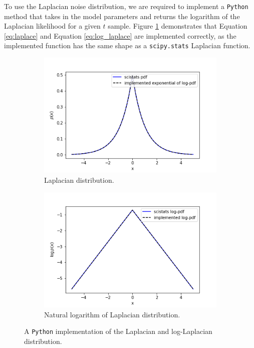 \documentclass{article}
\begin{document}
To use the Laplacian noise distribution, we are required to implement a \texttt{Python} method that takes in the model parameters and returns the logarithm of the Laplacian likelihood for a given $t$ sample. Figure \ref{fig:Q3b_laplace} demonstrates that Equation \eqref{eq:laplace} and Equation \eqref{eq:log_laplace} are implemented correctly, as the implemented function has the same shape as a \texttt{scipy.stats} Laplacian function.
\begin{figure}[!htb]
     \centering
     \begin{subfigure}[b]{0.45\textwidth}
         \centering
         \includegraphics[width=\textwidth]{Q3b_fig4.png}
         \caption{Laplacian distribution.}
     \end{subfigure}
     \hfill
     \begin{subfigure}[b]{0.45\textwidth}
         \centering
         \includegraphics[width=\textwidth]{Q3b_fig3.png}
         \caption{Natural logarithm of Laplacian distribution.}
     \end{subfigure}
        \caption{A \texttt{Python} implementation of the Laplacian and log-Laplacian distribution. }
        \label{fig:Q3b_laplace}
\end{figure}
\end{document}
